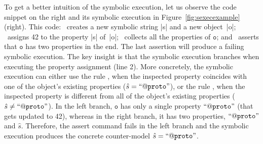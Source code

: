 To get a better intuition of the symbolic execution, let us observe the code snippet on the right and its symbolic execution in Figure~\ref{fig:sexecexample} (right). 
This code: 
        ~creates a new symbolic string \jsinline|s| and a new object~\jsinline|o|;
	~assigns 42 to the property \jsinline|s| of~\jsinline|o|; 
	~collects all the properties of $\mathtt{o}$; and
	~asserts that $\mathtt{o}$ has two properties in the end. 
	     The last assertion will produce a failing symbolic execution.
%
%
The key insight is that the symbolic execution branches when executing the property assignment (line 2).
% 
More concretely, the symbolic execution can either use the rule , when 
the inspected property coincides with one of the object's existing properties ({\small$\hat{s} = \mathtt{``@proto"}$}), 
or the rule , when the inspected property is different from all of the 
object's existing properties ({\small $\hat{s} \neq \mathtt{``@proto"}$}). 
%
In the left branch, $\mathtt{o}$ has only a single property {\small$\mathtt{``@proto"}$} (that gets updated to 42), whereas
in the right branch, it has two properties, {\small$\mathtt{``@proto"}$} and $\hat{s}$. 
%
Therefore, the assert command fails in the left branch and the symbolic execution  produces the concrete counter-model 
{\small$\hat{s} = \mathtt{``@proto"}$}.


